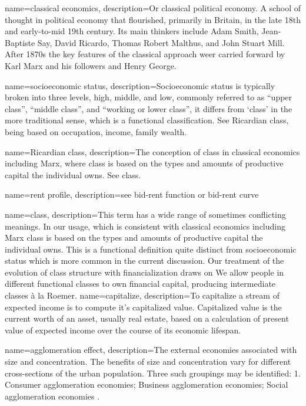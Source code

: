 {
name=classical economics,
description={Or classical political economy. A school of thought in political economy that flourished, primarily in Britain, in the late 18th and early-to-mid 19th century. Its main thinkers include Adam Smith, Jean-Baptiste Say, David Ricardo, Thomas Robert Malthus, and John Stuart Mill. After 1870s the key features of the classical approach weer carried forward by  Karl Marx and his followers and  Henry George.}
}

{
name=socioeconomic status,
description={Socioeconomic status is typically broken into three levels, high, middle, and low,  commonly referred to as ``upper class'', ``middle class'', and ``working or lower class'', it differs from `\gls{class}' in the more traditional sense, which is a functional classification. See \gls{Ricardian class}, being based on occupation, income, family wealth.}
}

{
name=Ricardian class,
description={The conception of class in \gls{classical economics} including Marx, where class is based on the types and amounts of productive capital the individual owns. See \gls{class}.}
}

{
name=rent profile,
description={see \gls{bid-rent function} or \gls{bid-rent curve}}
}

{
name=class,
description={This term has a wide range of sometimes conflicting meanings. In our usage, which is consistent with classical economics including Marx class is based on the types and amounts of productive capital the individual owns. This is a functional definition quite distinct from socioeconomic status which is more common in the current discussion. Our treatment of the evolution of class structure with financialization draws on We allow  people in different functional classes to own financial capital, producing intermediate classes \`a la Roemer\cite{roemerGeneralTheoryExploitation1982}.}
}
{
name=capitalize,
description={To capitalize a stream of expected income is to compute it's capitalized value. Capitalized value is the current worth of an asset, usually real estate, based on a calculation of present value of expected income over the course of its economic lifespan.}
}

{
name=agglomeration effect,
description={The external economies associated with size and concentration. The benefits of size and concentration vary for different cross-sections of the urban population. Three such groupings may be identified: 1. Consumer agglomeration economies; Business agglomeration economies; Social agglomeration economies \cite{carlinoAgglomerationEconomiesSurvey1978}.}
}

